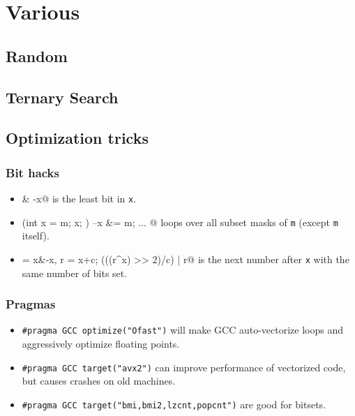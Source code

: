 \chapter{Various}

\section{Random}

\section{Ternary Search}

\section{Optimization tricks}
	\subsection{Bit hacks}
		\begin{itemize}
			\item \verb@x & -x@ is the least bit in \texttt{x}.
			\item \verb@for (int x = m; x; ) { --x &= m; ... }@ loops over all subset masks of \texttt{m} (except \texttt{m} itself).
			\item \verb@c = x&-x, r = x+c; (((r^x) >> 2)/c) | r@ is the next number after \texttt{x} with the same number of bits set.
		\end{itemize}
	\subsection{Pragmas}
		\begin{itemize}
			\item \lstinline{#pragma GCC optimize("Ofast")} will make GCC auto-vectorize loops and aggressively optimize floating points.
			\item \lstinline{#pragma GCC target("avx2")} can improve performance of vectorized code, but causes crashes on old machines.
			\item \lstinline{#pragma GCC target("bmi,bmi2,lzcnt,popcnt")} are good for bitsets.
		\end{itemize}
